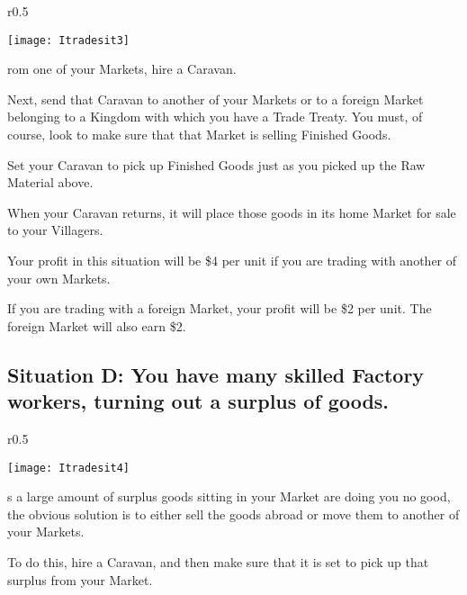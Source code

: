 \begin{wrapfigure}{r}{0.5\textwidth}
    \vspace{-20pt}
    \begin{center}
        \texttt{[image: Itradesit3]} %
    \end{center}
    \vspace{-20pt}
\end{wrapfigure}

rom one of your Markets, hire a Caravan.

Next, send that Caravan to another of your Markets or to a foreign Market belonging to a Kingdom with which you have a Trade Treaty. You must, of course, look to make sure that that Market is selling Finished Goods.

Set your Caravan to pick up Finished Goods just as you picked up the Raw Material above.

When your Caravan returns, it will place those goods in its home Market for sale to your Villagers.

Your profit in this situation will be \$4 per unit if you are trading with another of your own Markets.

If you are trading with a foreign Market, your profit will be \$2 per unit. The foreign Market will also earn \$2.

\subsection{\textsf{Situation D: You have many skilled Factory workers, turning out a surplus of goods.}}

\begin{wrapfigure}{r}{0.5\textwidth}
    \vspace{-20pt}
    \begin{center}
        \texttt{[image: Itradesit4]} %
    \end{center}
    \vspace{-20pt}
\end{wrapfigure}

s a large amount of surplus goods sitting in your Market are doing you no good, the obvious solution is to either sell the goods abroad or move them to another of your Markets.

To do this, hire a Caravan, and then make sure that it is set to pick up that surplus from your Market.


